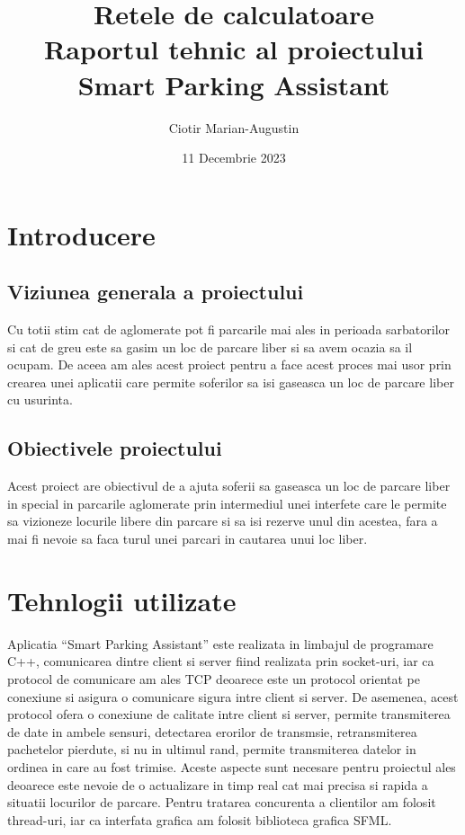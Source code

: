 \documentclass[runningheads]{llncs}
\title{
    Retele de calculatoare\\
    Raportul tehnic al proiectului\\
    Smart Parking Assistant
    }
\author{Ciotir Marian-Augustin}
\date{11 Decembrie 2023}
\institute{Facultatea de Informatica Iasi}
\begin{document}
\maketitle

\section{Introducere}
\subsection{Viziunea generala a proiectului}
Cu totii stim cat de aglomerate pot fi parcarile mai ales in perioada sarbatorilor si cat de greu este sa gasim un loc de parcare liber si sa avem ocazia sa il ocupam. De aceea am ales acest proiect pentru a face acest proces mai usor prin crearea unei aplicatii care permite soferilor sa isi gaseasca un loc de parcare liber cu usurinta.
\subsection{Obiectivele proiectului}
Acest proiect are obiectivul de a ajuta soferii sa gaseasca un loc de parcare liber in special in parcarile aglomerate prin intermediul unei interfete care le permite sa vizioneze locurile libere din parcare si sa isi rezerve unul din acestea, fara a mai fi nevoie sa faca turul unei parcari in cautarea unui loc liber.

\section{Tehnlogii utilizate}
Aplicatia ``Smart Parking Assistant'' este realizata in limbajul de programare C++, comunicarea dintre client si server fiind realizata prin socket-uri, iar ca protocol de comunicare am ales TCP deoarece este un protocol orientat pe conexiune si asigura o comunicare sigura intre client si server. De asemenea, acest protocol ofera o conexiune de calitate intre client si server, permite transmiterea de date in ambele sensuri, detectarea erorilor de transmsie, retransmiterea pachetelor pierdute, si nu in ultimul rand, permite transmiterea datelor in ordinea in care au fost trimise. Aceste aspecte sunt necesare pentru proiectul ales deoarece este nevoie de o actualizare in timp real cat mai precisa si rapida a situatii locurilor de parcare. Pentru tratarea concurenta a clientilor am folosit thread-uri, iar ca interfata grafica am folosit biblioteca grafica SFML.\\
\pagebreak
\end{document}
